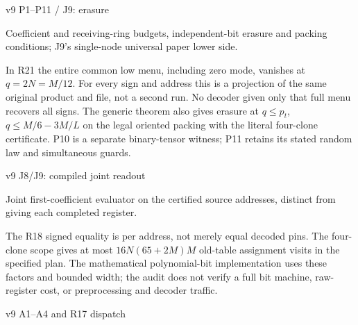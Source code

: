\documentclass[11pt,a4paper]{article}
\newlength{\OfflineResearchTableWidth}
\newcommand{\OfflineResearchRow}{\par}
\newenvironment{OfflineResearchTable}{%
  \par\medskip\begingroup\small\setlength{\parindent}{0pt}%
  \setlength{\parskip}{3pt plus 1pt minus .5pt}%
  \setlength{\OfflineResearchTableWidth}{\linewidth}%
}{%
  \par\endgroup\medskip%
}
\begin{document}
\begin{OfflineResearchTable}
\begin{minipage}[t]{0.49261\OfflineResearchTableWidth}
\end{minipage}%
\OfflineResearchRow
\noindent%
\begin{minipage}[t]{0.14074\OfflineResearchTableWidth}\raggedright
v9 P1--P11 / J9: erasure
\end{minipage}\hfill%
\begin{minipage}[t]{0.31165\OfflineResearchTableWidth}\raggedright
Coefficient and receiving-ring budgets, independent-bit erasure and packing conditions; J9's single-node universal paper lower side.
\end{minipage}\hfill%
\begin{minipage}[t]{0.49261\OfflineResearchTableWidth}\raggedright
In R21 the entire common low menu, including zero mode, vanishes at \(q=2N=M/12\). For every sign and address this is a projection of the same original product and file, not a second run. No decoder given only that full menu recovers all signs. The generic theorem  also gives erasure at \(q\le p_t\), \(q\le M/6-3M/L\) on the legal oriented packing with the literal four-clone certificate. P10 is a separate binary-tensor witness; P11 retains its stated random law and simultaneous guards.
\end{minipage}%
\OfflineResearchRow
\noindent%
\begin{minipage}[t]{0.14074\OfflineResearchTableWidth}\raggedright
v9 J8/J9: compiled joint readout
\end{minipage}\hfill%
\begin{minipage}[t]{0.31165\OfflineResearchTableWidth}\raggedright
Joint first-coefficient evaluator on the certified source addresses, distinct from giving each completed register.
\end{minipage}\hfill%
\begin{minipage}[t]{0.49261\OfflineResearchTableWidth}\raggedright
The R18 signed equality  is per address, not merely equal decoded pins. The four-clone scope gives at most \(16N(65+2M)M\) old-table assignment visits in the specified plan. The mathematical polynomial-bit implementation uses these factors and bounded width; the audit does not verify a full bit machine, raw-register cost, or preprocessing and decoder traffic.
\end{minipage}%
\OfflineResearchRow
\noindent%
\begin{minipage}[t]{0.14074\OfflineResearchTableWidth}\raggedright
v9 A1--A4 and R17 dispatch
\end{minipage}\hfill%
\begin{minipage}[t]{0.31165\OfflineResearchTableWidth}\raggedright

\end{minipage}
\end{OfflineResearchTable}
\end{document}
